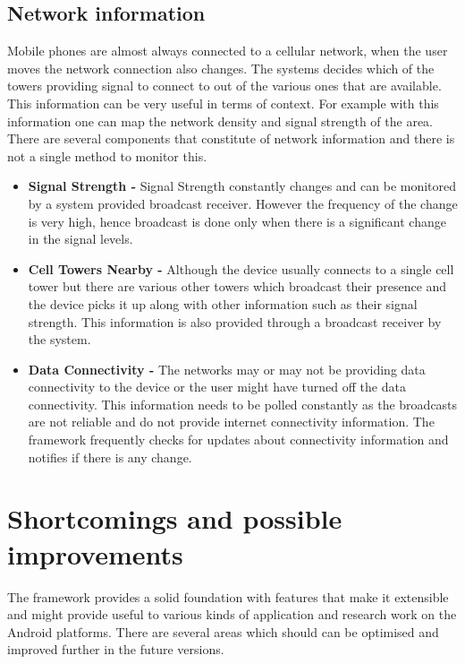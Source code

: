 \documentclass[12pt]{report}
\begin{document}
\subsection{Network information}
Mobile phones are almost always connected to a cellular network, when the user moves the network connection also changes. The systems decides which of the towers providing signal to connect to out of the various ones that are available. This information can be very useful in terms of context. For example with this information one can map the network density and signal strength of the area. There are several components that constitute of network information and there is not a single method to monitor this.

\begin{itemize}
\item \textbf{Signal Strength - } Signal Strength constantly changes and can be monitored by a system provided broadcast receiver. However the frequency of the change is very high, hence broadcast is done only when there is a significant change in the signal levels.

\item \textbf{Cell Towers Nearby - } Although the device usually connects to a single cell tower but there are various other towers which broadcast their presence and the device picks it up along with other information such as their signal strength. This information is also provided through a broadcast receiver by the system.

\item \textbf{Data Connectivity - } The networks may or may not be providing data connectivity to the device or the user might have turned off the data connectivity. This information needs to be polled constantly as the broadcasts are not reliable and do not provide internet connectivity information. The framework frequently checks for updates about connectivity information and notifies if there is any change.

\end{itemize}

\section{Shortcomings and possible improvements}
\label{contextShortcomings}
The framework provides a solid foundation with features that make it extensible and might provide useful to various kinds of application and research work on the Android platforms. There are several areas which should can be optimised and improved further in the future versions.
\end{document}
